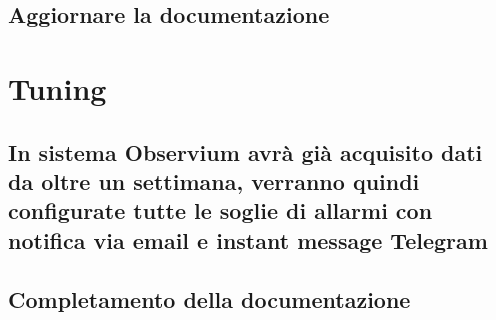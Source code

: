 \documentclass[Tesi.tex]{subfiles}
\begin{document}
\subsection{Aggiornare la documentazione}

\newpage
\section{Tuning}
\subsection{In sistema Observium avrà già acquisito dati da oltre un settimana, verranno quindi configurate tutte le soglie di allarmi con notifica via email e instant message Telegram}
\subsection{Completamento della documentazione}
\end{document}
